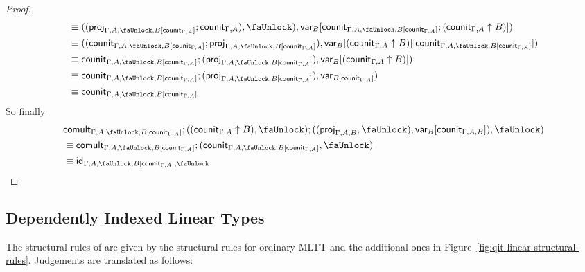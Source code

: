 \documentclass[10pt]{article}
\theoremstyle{definition}
\newcommand{\id}{\mathsf{id}}
\newcommand\proj[1]{\ensuremath{\mathsf{proj}_{#1}}}
\newcommand\qvar[1]{\ensuremath{\mathsf{var}_{#1}}}
\newcommand{\lock}{\text{\faUnlock}}
\newcommand{\counit}[1]{\mathsf{counit}_{#1}}
\newcommand{\comult}[1]{\mathsf{comult}_{#1}}
\begin{document}
\begin{proof}
\begin{align*}
&\equiv ((\proj{\Gamma, A, \lock, B[\counit{\Gamma, A}]};\counit{\Gamma, A}), \lock), \qvar{B}[\counit{\Gamma, A, \lock, B[\counit{\Gamma, A}]};(\counit{\Gamma, A} \uparrow B)]) \\
&\equiv ((\counit{\Gamma, A, \lock, B[\counit{\Gamma, A}]};\proj{\Gamma, A, \lock, B[\counit{\Gamma, A}]}), \qvar{B}[(\counit{\Gamma, A} \uparrow B)][\counit{\Gamma, A, \lock, B[\counit{\Gamma, A}]}]) \\
&\equiv \counit{\Gamma, A, \lock, B[\counit{\Gamma, A}]}; (\proj{\Gamma, A, \lock, B[\counit{\Gamma, A}]}), \qvar{B}[(\counit{\Gamma, A} \uparrow B)]) \\
&\equiv \counit{\Gamma, A, \lock, B[\counit{\Gamma, A}]}; (\proj{\Gamma, A, \lock, B[\counit{\Gamma, A}]}), \qvar{B[\counit{\Gamma, A}]}) \\
&\equiv \counit{\Gamma, A, \lock, B[\counit{\Gamma, A}]}
\end{align*}
So finally
\begin{align*}
&\comult{\Gamma, A, \lock, B[\counit{\Gamma, A}]};((\counit{\Gamma, A} \uparrow B), \lock);((\proj{\Gamma, A, B}, \lock), \qvar{B}[\counit{\Gamma, A,B}]), \lock) \\
&\equiv \comult{\Gamma, A, \lock, B[\counit{\Gamma, A}]};(\counit{\Gamma, A, \lock, B[\counit{\Gamma, A}]}, \lock) \\
&\equiv \id_{\Gamma, A, \lock, B[\counit{\Gamma, A}], \lock}
\end{align*}
\end{proof}

\subsection{Dependently Indexed Linear Types}

The structural rules of  are given by the structural rules for ordinary MLTT and the additional ones in Figure~\ref{fig:qit-linear-structural-rules}.  Judgements are translated as follows:
\end{document}
